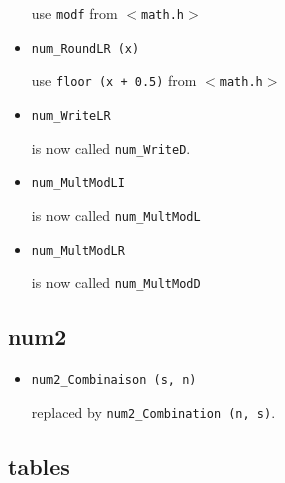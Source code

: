 \begin{itemize}
use  {\tt modf} from $<${\tt math.h}$>$

\item {\tt num\_RoundLR (x)}

use  {\tt floor (x + 0.5)} from $<${\tt math.h}$>$

\item {\tt num\_WriteLR}

is now called {\tt num\_WriteD}.

\item {\tt num\_MultModLI}

is now called {\tt num\_MultModL}

\item {\tt num\_MultModLR}

is now called {\tt num\_MultModD}

\end{itemize}



\subsection{num2}

\begin{itemize}

\item {\tt num2\_Combinaison (s, n)} 

replaced by {\tt num2\_Combination (n, s)}.
\end{itemize}


\subsection{tables}

